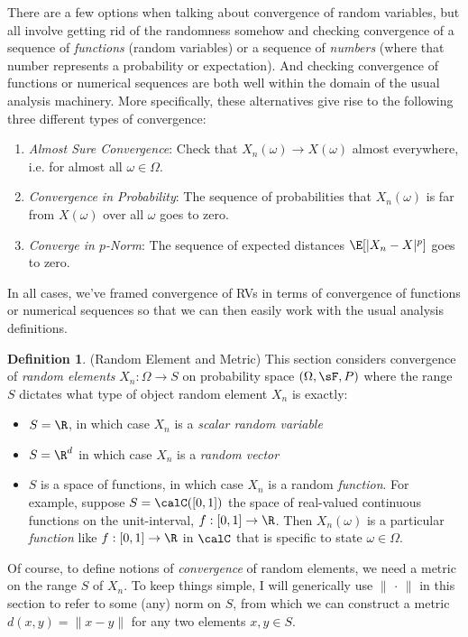 \documentclass[12pt]{article}
\theoremstyle{plain}
\theoremstyle{definition}
\newtheorem{defn}[thm]{Definition}
\theoremstyle{remark}
\newcommand{\ra}{\rightarrow}
\begin{document}
There are a few options when talking about convergence of random
variables, but all involve getting rid of the randomness somehow and
checking convergence of a sequence of \emph{functions} (random
variables) or a sequence of \emph{numbers} (where that number represents
a probability or expectation). And checking convergence of functions or
numerical sequences are both well within the domain of the usual
analysis machinery.  More specifically, these alternatives give rise to
the following three different types of convergence:
\begin{enumerate}
  \item \emph{Almost Sure Convergence}: Check that
    $X_n(\omega)\ra X(\omega)$ almost everywhere, i.e. for almost all
    $\omega\in\Omega$.
  \item \emph{Convergence in Probability}: The sequence of probabilities
    that $X_n(\omega)$ is far from $X(\omega)$ over all $\omega$ goes to
    zero.
  \item \emph{Converge in $p$-Norm}: The sequence of expected distances
    $\E[|X_n-X|^p]$ goes to zero.
\end{enumerate}
In all cases, we've framed convergence of RVs in terms of convergence of
functions or numerical sequences so that we can then easily work with
the usual analysis definitions.

\begin{defn}(Random Element and Metric)
This section considers convergence of \emph{random elements}
$X_n:\Omega\ra S$ on probability space $(\Omega,\sF,P)$
where the range $S$ dictates what type of object random element $X_n$ is
exactly:
\begin{itemize}
  \item $S=\R$, in which case $X_n$ is a \emph{scalar random variable}
  \item $S=\R^d$ in which case $X_n$ is a \emph{random vector}
  \item $S$ is a space of functions, in which case
    $X_n$ is a random \emph{function}.
    For example, suppose $S=\calC([0,1])$ the space of real-valued
    continuous functions on the unit-interval, $f:[0,1]\ra\R$.
    Then $X_n(\omega)$ is a particular \emph{function} like
    $f:[0,1]\ra\R$ in $\calC$ that is specific to state
    $\omega\in\Omega$.
\end{itemize}
Of course, to define notions of \emph{convergence} of random elements,
we need a metric on the range $S$ of $X_n$. To keep things simple, I
will generically use $\lVert\,\cdot\,\rVert$ in this section to refer to
some (any) norm on $S$, from which we can construct a metric
$d(x,y)=\lVert x-y\rVert$ for any two elements $x,y\in S$.
\end{defn}
\end{document}
